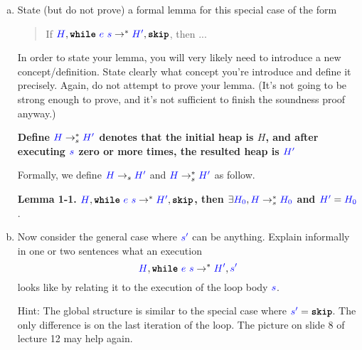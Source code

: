 \documentclass{article}
\theoremstyle{definition}
\newcommand{\meta}[1]{{\color{blue}#1}}
\newcommand{\progtext}[1]{\ensuremath{\text{\ttfamily\bfseries #1}}}
\newcommand{\impskip}{\progtext{skip}}
\newcommand{\while}{\progtext{while}}
\begin{document}
\begin{enumerate}[start=1,label={{\bf Problem \arabic*}.},ref=\arabic*,left=0pt..0pt,widest*=10,align=left,itemindent=*]
\begin{enumerate}[(a),left=1em]
  \item\label{prob:while-to-skip-lemma} State (but do not prove) a formal lemma for this special case of the form
    \begin{quote}
      If $\meta{H}, \while\ \meta{e}\ \meta{s} \to^* \meta{H'},\impskip$, then ...
    \end{quote}
    In order to state your lemma, you will very likely need to introduce a new
    concept/definition.  State clearly what concept you're introduce and define it
    precisely. Again, do not attempt to prove your lemma. (It's not going to be
    strong enough to prove, and it's not sufficient to finish the soundness proof anyway.)

    \textbf{Define $\meta{H}\to_s^* \meta{H^\prime}$ denotes that the initial heap is $H$, and after executing $\meta{s}$ zero or more times, the resulted heap is $\meta{H^\prime}$}

    Formally, we define $\meta{H} \to_s \meta{H^\prime}$ and $\meta{H}\to_s^* \meta{H^\prime}$ as follow.


    \textbf{Lemma 1-1. $\meta{H}, \while\ \meta{e}\ \meta{s} \to^* \meta{H'},\impskip$, then $\exists \meta{H_0}, \meta{H}\to_s^* \meta{H_0}$ and $\meta{H^\prime} = \meta{H_0}$}.

  \item Now consider the general case where $\meta{s'}$ can be anything. Explain informally in one or two sentences
    what an execution
    \[
      \meta{H}, \while\ \meta{e}\ \meta{s} \to^* \meta{H'},\meta{s'}
    \]
    looks like by relating it to the execution of the loop body $\meta{s}$.

    Hint: The global structure is similar to the special case where
    $\meta{s'}=\impskip$. The only difference is on the last iteration of the
    loop. The picture on slide 8 of lecture 12 may help again.


\end{enumerate}
\end{enumerate}
\end{document}
